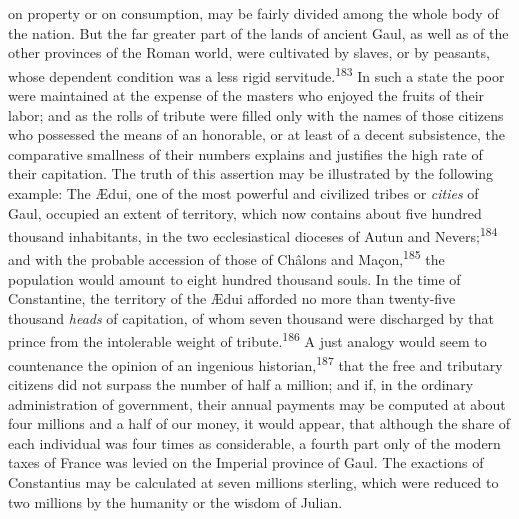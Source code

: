 on property or on consumption, may be fairly divided among the
whole body of the nation. But the far greater part of the lands
of ancient Gaul, as well as of the other provinces of the Roman
world, were cultivated by slaves, or by peasants, whose dependent
condition was a less rigid servitude.\textsuperscript{183} In such a state the
poor were maintained at the expense of the masters who enjoyed
the fruits of their labor; and as the rolls of tribute were
filled only with the names of those citizens who possessed the
means of an honorable, or at least of a decent subsistence, the
comparative smallness of their numbers explains and justifies the
high rate of their capitation. The truth of this assertion may be
illustrated by the following example: The Ædui, one of the most
powerful and civilized tribes or \textit{cities} of Gaul, occupied an
extent of territory, which now contains about five hundred
thousand inhabitants, in the two ecclesiastical dioceses of Autun
and Nevers;\textsuperscript{184} and with the probable accession of those of
Châlons and Maçon,\textsuperscript{185} the population would amount to eight
hundred thousand souls. In the time of Constantine, the territory
of the Ædui afforded no more than twenty-five thousand \textit{heads} of
capitation, of whom seven thousand were discharged by that prince
from the intolerable weight of tribute.\textsuperscript{186} A just analogy would
seem to countenance the opinion of an ingenious historian,\textsuperscript{187}
that the free and tributary citizens did not surpass the number
of half a million; and if, in the ordinary administration of
government, their annual payments may be computed at about four
millions and a half of our money, it would appear, that although
the share of each individual was four times as considerable, a
fourth part only of the modern taxes of France was levied on the
Imperial province of Gaul. The exactions of Constantius may be
calculated at seven millions sterling, which were reduced to two
millions by the humanity or the wisdom of Julian.

